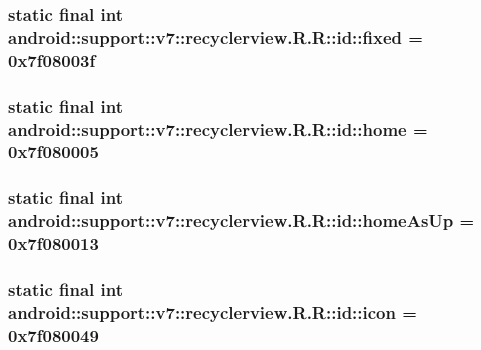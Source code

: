 \hypertarget{classandroid_1_1support_1_1v7_1_1recyclerview_1_1_r_1_1id_6cfb62bf0c786fa12061c50b7cc00c14}{
\subsubsection[{fixed}]{\setlength{\rightskip}{0pt plus 5cm}static final int android::support::v7::recyclerview.R.R::id::fixed = 0x7f08003f}}
\label{classandroid_1_1support_1_1v7_1_1recyclerview_1_1_r_1_1id_6cfb62bf0c786fa12061c50b7cc00c14}


\hypertarget{classandroid_1_1support_1_1v7_1_1recyclerview_1_1_r_1_1id_35cd0a5e01294fadd2200d23d4fe3bd5}{
\subsubsection[{home}]{\setlength{\rightskip}{0pt plus 5cm}static final int android::support::v7::recyclerview.R.R::id::home = 0x7f080005}}
\label{classandroid_1_1support_1_1v7_1_1recyclerview_1_1_r_1_1id_35cd0a5e01294fadd2200d23d4fe3bd5}


\hypertarget{classandroid_1_1support_1_1v7_1_1recyclerview_1_1_r_1_1id_3ee5495f5a61015ba183dba31b0302f2}{
\subsubsection[{homeAsUp}]{\setlength{\rightskip}{0pt plus 5cm}static final int android::support::v7::recyclerview.R.R::id::homeAsUp = 0x7f080013}}
\label{classandroid_1_1support_1_1v7_1_1recyclerview_1_1_r_1_1id_3ee5495f5a61015ba183dba31b0302f2}


\hypertarget{classandroid_1_1support_1_1v7_1_1recyclerview_1_1_r_1_1id_03091490fa472fbb963d78ec8efbef0f}{
\subsubsection[{icon}]{\setlength{\rightskip}{0pt plus 5cm}static final int android::support::v7::recyclerview.R.R::id::icon = 0x7f080049}}
\label{classandroid_1_1support_1_1v7_1_1recyclerview_1_1_r_1_1id_03091490fa472fbb963d78ec8efbef0f}


